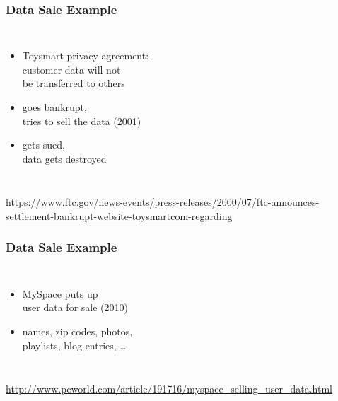 \documentclass[dvipsnames]{beamer}
\theoremstyle{plain}
\begin{document}
\begin{frame}
  \frametitle{Data Sale Example}

  \begin{columns}

    \begin{itemize}
      \item Toysmart privacy agreement:\\
        customer data will not\\
        be transferred to others
      \item goes bankrupt,\\
        tries to sell the data (2001)
      \item gets sued,\\
        data gets destroyed
    \end{itemize}
  \end{columns}

  \medskip
  \tiny{\url{https://www.ftc.gov/news-events/press-releases/2000/07/ftc-announces-settlement-bankrupt-website-toysmartcom-regarding}}\\
\end{frame}

\begin{frame}
  \frametitle{Data Sale Example}

  \begin{columns}

    \begin{itemize}
      \item MySpace puts up\\
        user data for sale (2010)
      \item names, zip codes, photos,\\
        playlists, blog entries, \ldots
    \end{itemize}
  \end{columns}

  \medskip
  \tiny{\url{http://www.pcworld.com/article/191716/myspace_selling_user_data.html}}\\
\end{frame}
\end{document}
